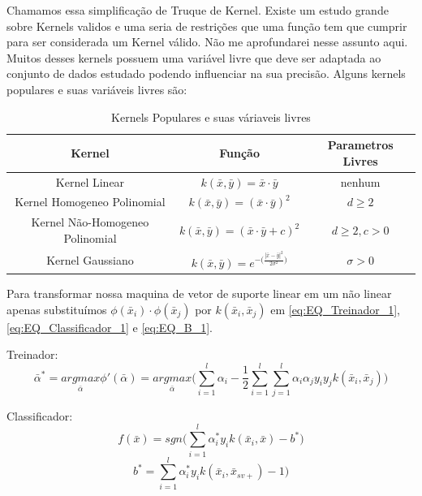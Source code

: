 Chamamos essa simplificação de Truque de Kernel. Existe um estudo grande sobre Kernels validos e uma seria de restrições que uma função tem que cumprir para ser considerada um Kernel válido. Não me aprofundarei nesse assunto aqui. Muitos desses kernels possuem uma variável livre que deve ser adaptada ao conjunto de dados estudado podendo influenciar na sua precisão. Alguns kernels populares e suas variáveis livres são:
\begin{table}
    \centering
    \caption{Kernels Populares e suas váriaveis livres}
    \begin{tabular}{c|c|c}
            Kernel & Função & Parametros Livres \\ \hline
        Kernel Linear & $k(\bar{x},\bar{y})=\bar{x}\cdot\bar{y}$ & nenhum \\
        Kernel Homogeneo Polinomial & $k(\bar{x},\bar{y})=(\bar{x}\cdot\bar{y})^2$ & $d\ge2$ \\
        Kernel Não-Homogeneo Polinomial & $k(\bar{x},\bar{y})=(\bar{x}\cdot\bar{y}+c)^2$ & $d\ge2, c > 0$ \\
        Kernel Gaussiano & $k(\bar{x},\bar{y})=e^{-\big(\frac{|\bar{x}-\bar{y}|^2}{2\sigma^2}\big)}$ & $\sigma>0$ \\ \hline
    \end{tabular}
    \label{tab:Kernels}
\end{table}

Para transformar nossa maquina de vetor de suporte linear em um não linear apenas substituímos $\phi(\bar{x}_i) \cdot \phi ( \bar{x}_j )$ por $k(\bar{x}_i,\bar{x}_j)$ em \ref{eq:EQ_Treinador_1}, \ref{eq:EQ_Classificador_1} e \ref{eq:EQ_B_1}.

Treinador:
\begin{equation}
    \bar{\alpha}^* = \underset{\bar{\alpha}}{argmax}{\phi}'(\bar{\alpha}) =\underset{\bar{\alpha}}{argmax} \Bigg( \sum_{i=1}^{l}\alpha_i - \frac{1}{2}\sum_{i=1}^{l}\sum_{j=1}^{l}\alpha_i \alpha_j y_i y_j k(\bar{x}_i,\bar{x}_j) \Bigg)
    \label{eq:EQ_Treinador_2}
\end{equation}

Classificador:
\begin{equation}
    f(\bar{x}) = sgn\Bigg(
        \sum_{i=1}^{l} \alpha_i^*y_i k(\bar{x}_i,\bar{x})
        -b^*
    \Bigg)
    \label{eq:EQ_Classificador_2}
\end{equation}
\begin{equation}
    b^* = \sum_{i=1}^{l} \alpha_i^*y_i k(\bar{x}_i,\bar{x}_{sv+})
        -1
    \Bigg)
    \label{eq:EQ_B_2}
\end{equation}

